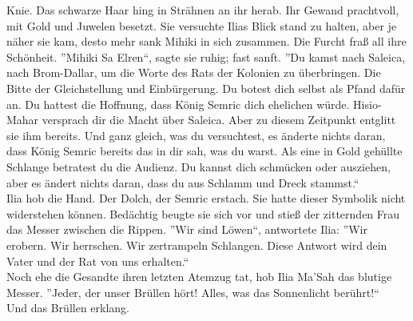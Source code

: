 Knie. Das schwarze Haar hing in Strähnen an ihr herab. Ihr Gewand prachtvoll, mit Gold und Juwelen 
besetzt. Sie versuchte Ilias Blick stand zu halten, aber je näher sie kam, desto mehr sank Mihiki 
in sich zusammen. Die Furcht fraß all ihre Schönheit. 
''Mihiki Sa Elren``, sagte sie ruhig; fast sanft. ''Du kamst nach Saleica, nach Brom-Dallar, um die 
Worte des Rats der Kolonien zu überbringen. Die Bitte der Gleichstellung und Einbürgerung. Du 
botest dich selbst als Pfand dafür an. Du hattest die Hoffnung, dass König Semric dich 
ehelichen würde. Hisio-Mahar versprach dir die Macht über Saleica. Aber zu diesem Zeitpunkt 
entglitt sie ihm bereits. Und ganz gleich, was du versuchtest, es änderte nichts daran, dass 
König Semric bereits das in dir sah, was du warst. Als eine in Gold gehüllte Schlange betratest 
du die Audienz. Du kannst dich schmücken oder ausziehen, aber es ändert nichts daran, dass du aus 
Schlamm und Dreck stammst.``\\
Ilia hob die Hand. Der Dolch, der Semric erstach. Sie hatte dieser Symbolik nicht widerstehen 
können. Bedächtig beugte sie sich vor und stieß der zitternden Frau das Messer zwischen die Rippen. 
''Wir sind Löwen``, antwortete Ilia: ''Wir erobern. Wir herrschen. Wir zertrampeln Schlangen. Diese 
Antwort wird dein Vater und der Rat von uns erhalten.``\\
Noch ehe die Gesandte ihren letzten Atemzug tat, hob Ilia Ma'Sah das blutige Messer. ''Jeder, der 
unser Brüllen hört! Alles, was das Sonnenlicht berührt!``\\
Und das Brüllen erklang.\\




